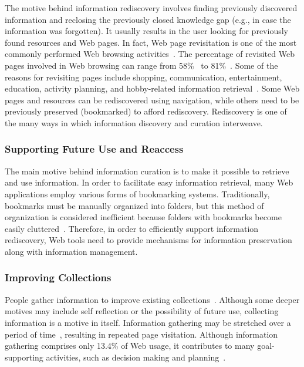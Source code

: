 \documentclass{sigchi}
\begin{document}
{{{The motive behind information rediscovery involves finding previously discovered information and reclosing the previously closed knowledge gap (e.g., in case the information was forgotten). It usually results in the user looking for previously found resources and Web pages. In fact, Web page revisitation is one of the most commonly performed Web browsing activities~\cite{adar2008large,cockburn2003improving}. The percentage of revisited Web pages involved in Web browsing can range from 58\%~\cite{tauscher1997people} to 81\%~\cite{cockburn2001web}. Some of the reasons for revisiting pages include shopping, communication, entertainment, education, activity planning, and hobby-related information retrieval~\cite{adar2008large}.
Some Web pages and resources can be rediscovered using navigation, while others need to be previously preserved (bookmarked) to afford rediscovery. Rediscovery is one of the many ways in which information discovery and curation interweave. 
}

{\subsubsection{Supporting Future Use and Reaccess}
The main motive behind information curation is to make it possible to retrieve and use information. In order to facilitate easy information retrieval, many Web applications employ various forms of bookmarking systems. Traditionally, bookmarks must be manually organized into folders, but this method of organization is considered inefficient because folders with bookmarks become easily cluttered~\cite{abrams1998information}. Therefore, in order to efficiently support information rediscovery, Web tools need to provide mechanisms for information preservation along with information management.
}

{\subsubsection{Improving Collections}
People gather information to improve existing collections~\cite{lindley2012s}. Although some deeper motives may include self reflection or the possibility of future use, collecting information is a motive in itself. Information gathering may be stretched over a period of time~\cite{kellar2006goal}, resulting in repeated page visitation. Although information gathering comprises only 13.4\% of Web usage, it contributes to many goal-supporting activities, such as decision making and planning~\cite{kellar2006goal}.

}}}
\end{document}
